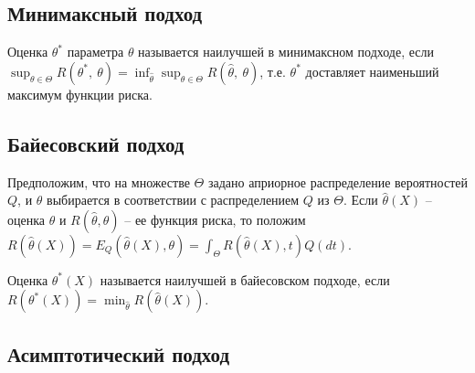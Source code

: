     \subsection{Минимаксный подход}
    \begin{definition}
    Оценка $\displaystyle \theta ^{*}$ параметра $\displaystyle \theta $ называется наилучшей в минимаксном подходе, если $\displaystyle \sup _{\theta \in \Theta } R\left( \theta ^{*} ,\ \theta \right) =\inf_{\hat{\theta }}\sup _{\theta \in \Theta } R(\hat{\theta } ,\ \theta )$, т.е. $\displaystyle \theta ^{*}$ доставляет наименьший максимум функции риска.
    \end{definition}
    \subsection{Байесовский подход}
    
    Предположим, что на множестве $\displaystyle \Theta $ задано априорное распределение вероятностей $\displaystyle Q$, и $\displaystyle \theta $ выбирается в соответствии с распределением $\displaystyle Q$ из $\displaystyle \Theta $. Если $\displaystyle \hat{\theta }( X)$ -- оценка $\displaystyle \theta $ и $\displaystyle R(\hat{\theta } ,\theta )$ -- ее функция риска, то положим $\displaystyle R(\hat{\theta }( X)) =E_{Q}(\hat{\theta }( X) ,\theta ) =\int _{\Theta } R(\hat{\theta }( X) ,t) Q( dt)$.
    \begin{definition}
    Оценка $\displaystyle \theta ^{*}( X)$ называется наилучшей в байесовском подходе, если $\displaystyle R\left( \theta ^{*}( X)\right) =\min_{\hat{\theta }} R(\hat{\theta }( X))$.
    \end{definition}
    \subsection{Асимптотический подход}
    
